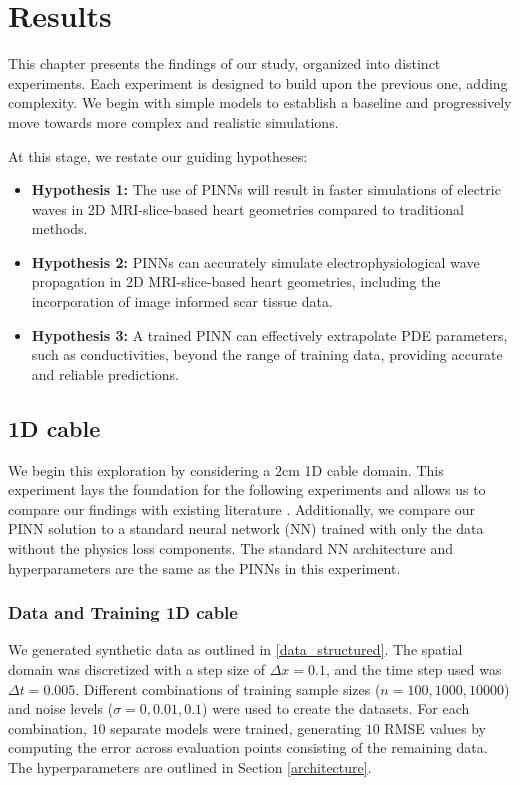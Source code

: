 \chapter{Results}
This chapter presents the findings of our study, organized into distinct experiments. Each experiment is designed to build upon the previous one, adding complexity. We begin with simple models to establish a baseline and progressively move towards more complex and realistic simulations. 

At this stage, we restate our guiding hypotheses:

\begin{itemize}
    \item \textbf{Hypothesis 1:} The use of PINNs will result in faster simulations of electric waves in  2D MRI-slice-based heart geometries compared to traditional methods.
    \item \textbf{Hypothesis 2:} PINNs can accurately simulate electrophysiological wave propagation in 2D MRI-slice-based heart geometries, including the incorporation of image informed scar tissue data.
    \item \textbf{Hypothesis 3:} A trained PINN can effectively extrapolate PDE parameters, such as conductivities, beyond the range of training data, providing accurate and reliable predictions.

\end{itemize}




\section{1D cable}
We begin this exploration by considering a $2\mathrm{cm}$ 1D cable domain. This experiment lays the foundation for the following experiments and allows us to compare our findings with existing literature \cite{EP-PINNs}. Additionally, we compare our PINN solution to a standard neural network (NN) trained with only the data without the physics loss components. The standard NN architecture and hyperparameters are the same as the PINNs in this experiment. 
\subsection{Data and Training 1D cable}
We generated synthetic data as outlined in \ref{data_structured}. The spatial domain was discretized with a step size of $\Delta x = 0.1$, and the time step used was $\Delta t = 0.005$. Different combinations of training sample sizes ($n=100,1000,10000$) and noise levels ($\sigma=0,0.01,0.1$) were used to create the datasets. 
For each combination, $10$ separate models were trained, generating $10$ RMSE values by computing the error across evaluation points consisting of the remaining data. The hyperparameters are outlined in Section \ref{architecture}.

